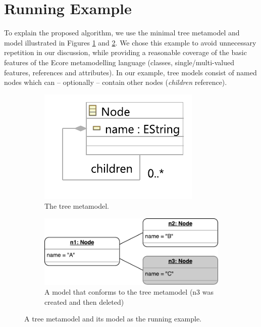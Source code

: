 \documentclass{llncs}
\begin{document}
\section{Running Example}
\label{sec:case_study}
To explain the proposed algorithm, we use the minimal tree metamodel and model illustrated in Figures \ref{fig:tree_metamodel} and \ref{fig:initial_model}. We chose this example to avoid unnecessary repetition in our discussion, while providing a reasonable coverage of the basic features of the Ecore metamodelling language (classes, single/multi-valued features, references and attributes). In our example, tree models consist of named nodes which can -- optionally -- contain other nodes (\emph{children} reference).

\begin{figure}[ht]	
	\begin{subfigure}[t]{0.4\linewidth}
	    \centering
		\includegraphics[width=0.8\linewidth]{node_metamodel}
    \caption{The tree metamodel.}
    \label{fig:tree_metamodel}
	\end{subfigure}
	\hfill
	\begin{subfigure}[t]{0.6\linewidth}
	    \centering
		\includegraphics[width=\linewidth]{initial_chart}
\caption{A model that conforms to the tree metamodel (n3 was created and then deleted)}
\label{fig:initial_model}
	\end{subfigure}
	\caption{A tree metamodel and its model as the running example.}
	\label{fig:append_speed}
\end{figure}
\end{document}
